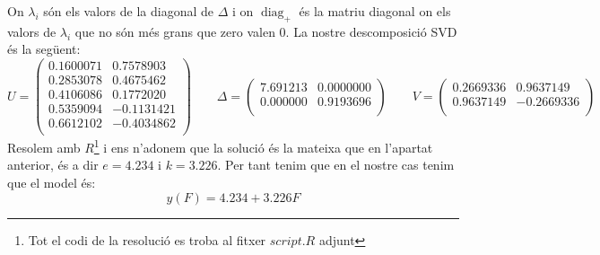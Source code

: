 \documentclass[a4paper]{article}
\DeclareMathOperator{\diag}{diag}
\begin{document}
\begin{enumerate}
	 On $\lambda_i$ són els valors de la diagonal de $\Delta$ i on $\diag_+$ és la matriu diagonal on els valors de $\lambda_i$ que no són més grans que zero valen 0. La nostre descomposició SVD és la següent:
	 $$
	 U =
	 \begin{pmatrix}
		 0.1600071 & 0.7578903 \\
		 0.2853078 & 0.4675462 \\
		 0.4106086 & 0.1772020 \\
		 0.5359094 &-0.1131421 \\
		 0.6612102 &-0.4034862 \\
	 \end{pmatrix}
	 \qquad
	 \Delta =
	 \begin{pmatrix} 
		 7.691213 & 0.0000000 \\
		 0.000000 & 0.9193696 \\
	 \end{pmatrix}
	 \qquad
	  V =
	 \begin{pmatrix}
	 0.2669336 & 0.9637149 \\
	 0.9637149 & -0.2669336 \\
	 \end{pmatrix}
	 \qquad
	 $$
	 Resolem amb $R$\footnote{Tot el codi de la resolució es troba al fitxer $script.R$ adjunt } i ens n'adonem que la solució és la mateixa que en l'apartat anterior, és a dir $e = 4.234$ i $k = 3.226$. Per tant tenim que en el nostre cas tenim que el model és:
	 $$
	 y(F) = 4.234 + 3.226 F
	 $$

	 
	
\end{enumerate}
\end{document}
